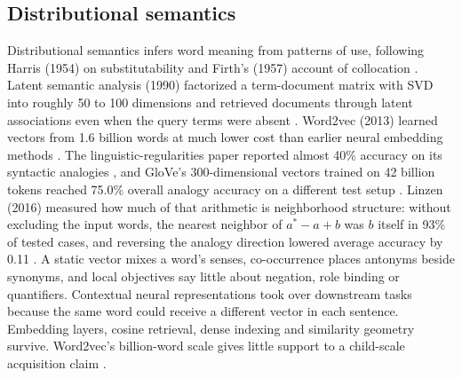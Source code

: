 \subsection{Distributional semantics}
Distributional semantics infers word meaning from patterns of use, following Harris (1954) on substitutability \cite{pre10} and Firth's (1957) account of collocation \cite{pre11}. Latent semantic analysis (1990) factorized a term-document matrix with SVD into roughly 50 to 100 dimensions and retrieved documents through latent associations even when the query terms were absent \cite{pre12}. Word2vec (2013) learned vectors from 1.6 billion words at much lower cost than earlier neural embedding methods \cite{pre13}. The linguistic-regularities paper reported almost 40\% accuracy on its syntactic analogies \cite{pre14}, and GloVe's 300-dimensional vectors trained on 42 billion tokens reached 75.0\% overall analogy accuracy on a different test setup \cite{pre15}. Linzen (2016) measured how much of that arithmetic is neighborhood structure: without excluding the input words, the nearest neighbor of $a^*-a+b$ was $b$ itself in 93\% of tested cases, and reversing the analogy direction lowered average accuracy by 0.11 \cite{pre16}. A static vector mixes a word's senses, co-occurrence places antonyms beside synonyms, and local objectives say little about negation, role binding or quantifiers. Contextual neural representations took over downstream tasks because the same word could receive a different vector in each sentence. Embedding layers, cosine retrieval, dense indexing and similarity geometry survive. Word2vec's billion-word scale gives little support to a child-scale acquisition claim \cite{pre13}.


